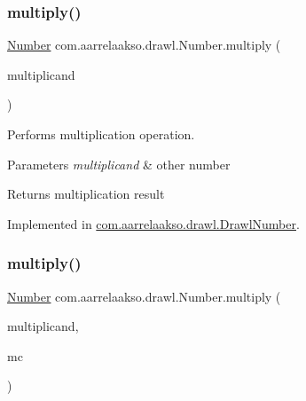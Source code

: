 \subsubsection{\texorpdfstring{multiply()}{multiply()}\hspace{0.1cm}{\footnotesize\ttfamily [1/3]}}
{\footnotesize\ttfamily \hyperlink{interfacecom_1_1aarrelaakso_1_1drawl_1_1_number}{Number} com.\+aarrelaakso.\+drawl.\+Number.\+multiply (\begin{DoxyParamCaption}\item[{@Not\+Null final \hyperlink{interfacecom_1_1aarrelaakso_1_1drawl_1_1_number}{Number}}]{multiplicand }\end{DoxyParamCaption})}



Performs multiplication operation. 


\begin{DoxyParams}{Parameters}
{\em multiplicand} & other number \\
\hline
\end{DoxyParams}
\begin{DoxyReturn}{Returns}
multiplication result 
\end{DoxyReturn}


Implemented in \hyperlink{classcom_1_1aarrelaakso_1_1drawl_1_1_drawl_number_ad26a515fb406363d921543b82c428b46}{com.\+aarrelaakso.\+drawl.\+Drawl\+Number}.

\mbox{\label{interfacecom_1_1aarrelaakso_1_1drawl_1_1_number_a8e43a4a565fb62b7f71a809aa791ecc2}} 
\subsubsection{\texorpdfstring{multiply()}{multiply()}\hspace{0.1cm}{\footnotesize\ttfamily [2/3]}}
{\footnotesize\ttfamily \hyperlink{interfacecom_1_1aarrelaakso_1_1drawl_1_1_number}{Number} com.\+aarrelaakso.\+drawl.\+Number.\+multiply (\begin{DoxyParamCaption}\item[{@Not\+Null final \hyperlink{interfacecom_1_1aarrelaakso_1_1drawl_1_1_number}{Number}}]{multiplicand,  }\item[{final Math\+Context}]{mc }\end{DoxyParamCaption})}



